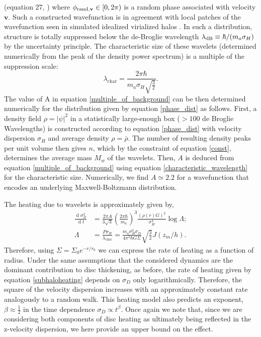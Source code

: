 \documentclass[usenatbib]{mnras}
\renewcommand{\d}[1]{\! \mathrm{d}#1 \:}
\newcommand{\deriv}[2]{\frac{\d{#1}}{\d{#2}}}
\renewcommand{\d}[1]{\ensuremath{\operatorname{d}\!{#1}}}
\begin{document}
(equation 27, \cite{Schrodinger-Poisson}) where $\phi_{{\rm rand},\mathbf{v}}\in[0,2\pi)$ is a random phase associated with velocity $\mathbf{v}$.
Such a constructed wavefunction is in agreement with local patches of the wavefunction seen in simulated idealized virialized halos \citep{BECDM}.
In such a distribution, structure is totally suppressed below the de-Broglie wavelength $\lambda_{\rm dB} \equiv \hbar/(m_a \sigma_H)$ by the uncertainty principle.
The characteristic size of these wavelets (determined numerically from the peak of the density power spectrum) is a multiple of the suppression scale:
\begin{equation} \label{characteristic_wavelength}
\lambda_{\text{char}} = \frac{ 2 \pi \hbar}{m_a \sigma_H \sqrt{\frac{3}{2}}}.
\end{equation}
The value of A in equation \eqref{multiple_of_background} can be then determined numerically for the distribution given by equation \eqref{phase_dist} as follows. First, a density field $\rho = |\psi|^2$ in a statistically large-enough box ($> 100$ de Broglie Wavelengths) is constructed according to equation \eqref{phase_dist} with velocity dispersion $\sigma_H$ and average density $\rho = \bar{\rho}$. The number of resulting density peaks per unit volume then gives $n$, which by the constraint of equation \eqref{const}, determines the average mass $M_w$ of the wavelets. Then, $A$ is deduced from equation \eqref{multiple_of_background} using equation \eqref{characteristic_wavelength} for the characteristic size. Numerically, we find $A\simeq 2.2$ for a wavefunction that encodes an underlying Maxwell-Boltzmann distribution.
\par
The heating due to wavelets is approximately given by,
\begin{subequations} \label{FDMheating}
\begin{align}
\deriv{\sigma_D^2}{t} & = \frac{2 \pi A}{3 \sqrt{3}} \left( \frac{2 \pi \hbar }{m_a} \right)^3 \frac{(\rho(r) G)^2}{\sigma_H^4} \log{\Lambda} ;
\\
\Lambda & = \frac{P \sigma_H}{\lambda_{\text{char}}} = \frac{m_a \sigma_H^2 \sigma_D}{4 \pi^2 \hbar G \Sigma} \sqrt{\tfrac{3}{2}} J(z_m / h) .
\end{align}
\end{subequations}
Therefore, using $\Sigma = \Sigma_0 e^{-r/r_0}$ we can express the rate of heating as a function of radius. Under the same assumptions that the considered dynamics are the dominant contribution to disc thickening, as before, the rate of heating given by equation \eqref{subhaloheating} depends on $\sigma_D$ only logarithmically. Therefore, the square of the velocity dispersion increases with an approximately constant rate analogously to a random walk. This heating model also predicts an exponent, $\beta \approx \tfrac{1}{2}$ in the time dependence $\sigma_D \propto t^{\beta}$. Once again we note that, since we are considering both components of disc heating as ultimately being reflected in the z-velocity dispersion, we here provide an upper bound on the effect. 
\end{document}
